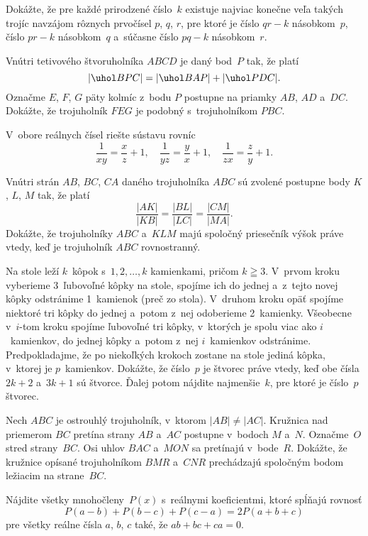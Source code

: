 {%
Dokážte, že pre každé prirodzené číslo~$k$ existuje najviac konečne
veľa takých trojíc navzájom rôznych prvočísel $p$, $q$, $r$,
pre ktoré je číslo $qr-k$ násobkom~$p$, číslo $pr-k$ násobkom~$q$
a~súčasne číslo $pq-k$ násobkom~$r$.}

{%
Vnútri tetivového štvoruholníka $ABCD$ je daný
bod~$P$ tak, že platí
$$
|\uhol BPC|=|\uhol BAP|+|\uhol PDC|.
$$
Označme $E$, $F$, $G$ päty kolmíc z~bodu $P$ postupne na priamky
$AB$, $AD$ a~$DC$. Dokážte, že trojuholník $FEG$ je podobný
s~trojuholníkom $PBC$.}

{%
V~obore reálnych čísel riešte sústavu rovníc
$$
\frac{1}{xy}=\frac{x}{z}+1,\quad
\frac{1}{yz}=\frac{y}{x}+1,\quad
\frac{1}{zx}=\frac{z}{y}+1.
$$}

{%
Vnútri strán $AB$, $BC$, $CA$ daného trojuholníka $ABC$ sú
zvolené postupne body $K$, $L$, $M$ tak, že platí
$$
\frac{|AK|}{|KB|}=\frac{|BL|}{|LC|}=\frac{|CM|}{|MA|}.
$$
Dokážte, že trojuholníky $ABC$ a~$KLM$ majú spoločný priesečník
výšok práve vtedy, keď je trojuholník $ABC$ rovnostranný.}

{%
Na stole leží $k$~kôpok s~$1, 2, \dots, k$ kamienkami, pričom
$k\geqq3$. V~prvom kroku vyberieme 3~ľubovoľné kôpky na stole,
spojíme ich do jednej a~z~tejto novej kôpky odstránime 1~kamienok
(preč zo stola). V~druhom kroku opäť spojíme niektoré tri
kôpky do jednej a~potom z~nej odoberieme 2~kamienky. Všeobecne v~$i$-tom
kroku spojíme ľubovoľné tri kôpky, v~ktorých je spolu
viac ako $i$~kamienkov, do jednej kôpky a~potom z~nej $i$~kamienkov
odstránime. Predpokladajme, že po niekoľkých krokoch zostane na
stole jediná kôpka, v~ktorej je $p$~kamienkov. Dokážte, že číslo~$p$
je štvorec práve vtedy, keď obe čísla $2k+2$ a~$3k+1$ sú štvorce.
Ďalej potom nájdite najmenšie~$k$, pre ktoré je číslo~$p$ štvorec.}

{%
Nech $ABC$ je ostrouhlý trojuholník, v~ktorom $|AB|\not =|AC|$.
Kružnica nad priemerom $BC$ pretína strany $AB$ a~$AC$ postupne
v~bodoch $M$ a~$N$. Označme~$O$ stred strany~$BC$. Osi uhlov $BAC$
a~$MON$ sa pretínajú v~bode~$R$. Dokážte, že kružnice opísané
trojuholníkom $BMR$ a~$CNR$ prechádzajú spoločným bodom ležiacim na
strane~$BC$.}

{%
Nájdite všetky mnohočleny~$P(x)$ s~reálnymi
koeficientmi, ktoré spĺňajú rovnosť
$$
P(a-b)+P(b-c)+P(c-a)=2P(a+b+c)
$$
pre všetky reálne čísla $a$, $b$, $c$ také, že $ab+bc+ca=0$.}

